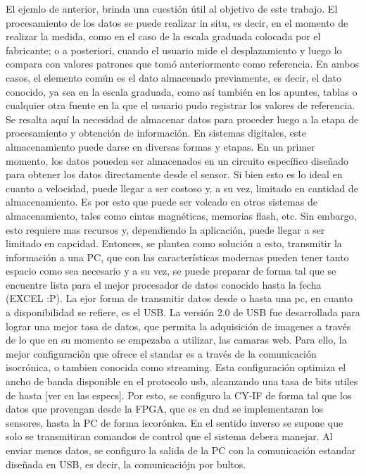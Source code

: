 	El ejemlo de anterior, brinda una cuestión útil al objetivo de este trabajo. El procesamiento de los datos se puede realizar in situ, es decir, en el momento de realizar la medida, como
en el caso de la escala graduada colocada por el fabricante; o a posteriori, cuando el usuario mide el desplazamiento y luego lo compara con valores patrones que tomó anteriormente como referencia.
En ambos casos, el elemento común es el dato almacenado previamente, es decir, el dato conocido, ya sea en la escala graduada, como así también en los apuntes, tablas o cualquier otra fuente
en la que el usuario pudo registrar los valores de referencia.\\
	Se resalta aquí la necesidad de almacenar datos para proceder luego a la etapa de procesamiento y obtención de información. En sistemas digitales, este almacenamiento puede darse en diversas
formas y etapas. En un primer momento, los datos poueden ser almacenados en un circuito específico diseñado para obtener los datos directamente desde el sensor. Si bien esto es lo ideal en cuanto a
velocidad, puede llegar a ser costoso y, a su vez, limitado en cantidad de almacenamiento. Es por esto que puede ser volcado en otros sistemas de almacenamiento, tales como cintas magnéticas, 
memorias flash, etc. Sin embargo, esto requiere mas recursos y, dependiendo la aplicación, puede llegar a ser limitado en capcidad. Entonces, se plantea como solución a esto, transmitir la información
a una PC, que con las características modernas pueden tener tanto espacio como sea necesario y a su vez, se puede preparar de forma tal que se encuentre lista para el mejor procesador de datos
conocido hasta la fecha (EXCEL :P).
	La ejor forma de transmitir datos desde o hasta una pc, en cuanto a disponibilidad se refiere, es el USB.
	La versión 2.0 de USB fue desarrollada para lograr una mejor tasa de datos, que permita la adquisición de imagenes a través de lo que en su momento se empezaba a utilizar, las camaras
web.
	Para ello, la mejor configuración que ofrece el standar es a través de la comunicación isocrónica, o tambien conocida como streaming. Esta configuración optimiza el ancho de banda disponible
en el protocolo usb, alcanzando una tasa de bits utiles de hasta [ver en las especs].
	Por esto, se configuro la CY-IF de forma tal que los datos que provengan desde la FPGA, que es en dnd se implementaran los sensores, hasta la PC de forma iscorónica.
	En el sentido inverso se supone que solo se transmitiran comandos de control que el sistema debera manejar. Al enviar menos datos, se configuro la salida de la PC con la comunicación 
estandar diseñada en USB, es decir, la comunicaciójn por bultos.

